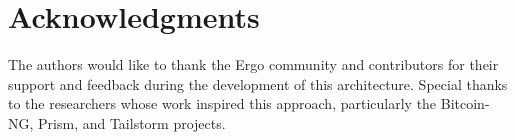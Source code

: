 \documentclass{llncs}
\begin{document}
\section*{Acknowledgments}

The authors would like to thank the Ergo community and contributors for their support and feedback during the development of this architecture. Special thanks to the researchers whose work inspired this approach, particularly the Bitcoin-NG, Prism, and Tailstorm projects.



\end{document}
